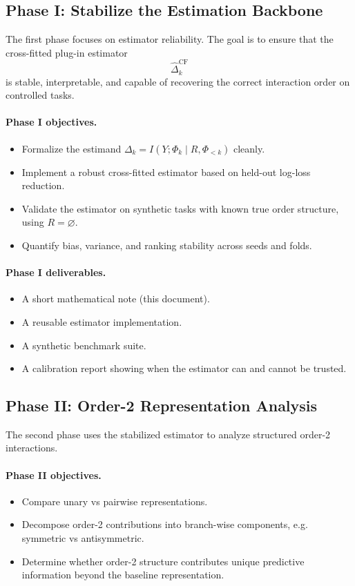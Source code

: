 \documentclass[11pt]{article}
\newcommand{\1}{\mathbf{1}}
\begin{document}
\subsection{Phase I: Stabilize the Estimation Backbone}

The first phase focuses on estimator reliability. The goal is to ensure that the cross-fitted
plug-in estimator
\[
\widehat{\Delta}^{\mathrm{CF}}_k
\]
is stable, interpretable, and capable of recovering the correct interaction order on controlled tasks.

\paragraph{Phase I objectives.}
\begin{itemize}[leftmargin=1.5em]
    \item Formalize the estimand $\Delta_k = I(Y;\Phi_k \mid R,\Phi_{<k})$ cleanly.
    \item Implement a robust cross-fitted estimator based on held-out log-loss reduction.
    \item Validate the estimator on synthetic tasks with known true order structure, using $R = \varnothing$.
    \item Quantify bias, variance, and ranking stability across seeds and folds.
\end{itemize}

\paragraph{Phase I deliverables.}
\begin{itemize}[leftmargin=1.5em]
    \item A short mathematical note (this document).
    \item A reusable estimator implementation.
    \item A synthetic benchmark suite.
    \item A calibration report showing when the estimator can and cannot be trusted.
\end{itemize}

\subsection{Phase II: Order-2 Representation Analysis}

The second phase uses the stabilized estimator to analyze structured order-2 interactions.

\paragraph{Phase II objectives.}
\begin{itemize}[leftmargin=1.5em]
    \item Compare unary vs pairwise representations.
    \item Decompose order-2 contributions into branch-wise components, e.g. symmetric vs
    antisymmetric.
    \item Determine whether order-2 structure contributes unique predictive information beyond the
    baseline representation.
\end{itemize}
\end{document}
